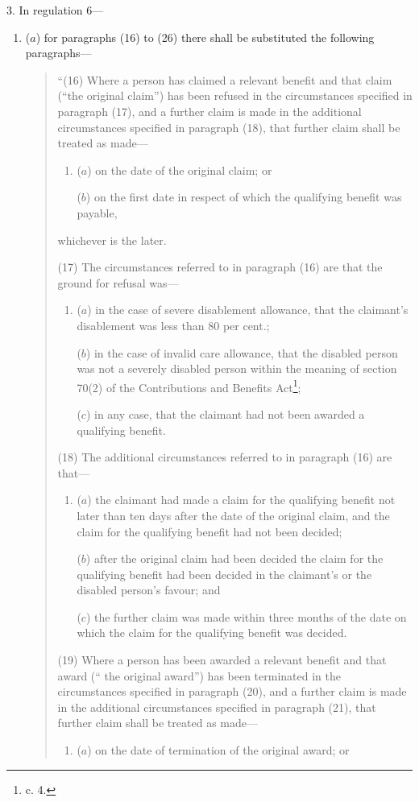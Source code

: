 \documentclass[12pt,a4paper]{article}
\begin{document}
3.  In regulation 6—
\begin{enumerate}\item[]
($a$) for paragraphs (16) to (26) there shall be substituted the following paragraphs—
\begin{quotation}
“(16) Where a person has claimed a relevant benefit and that claim (“the original claim”) has been refused in the circumstances specified in paragraph (17), and a further claim is made in the additional circumstances specified in paragraph (18), that further claim shall be treated as made—
\begin{enumerate}\item[]
($a$) on the date of the original claim; or

($b$) on the first date in respect of which the qualifying benefit was payable,
\end{enumerate}
whichever is the later.

(17) The circumstances referred to in paragraph (16) are that the ground for refusal was—
\begin{enumerate}\item[]
($a$) in the case of severe disablement allowance, that the claimant’s disablement was less than 80 per cent.;

($b$) in the case of invalid care allowance, that the disabled person was not a severely disabled person within the meaning of section 70(2) of the Contributions and Benefits Act\footnote{ c. 4.};

($c$) in any case, that the claimant had not been awarded a qualifying benefit.
\end{enumerate}

(18) The additional circumstances referred to in paragraph (16) are that—
\begin{enumerate}\item[]
($a$) the claimant had made a claim for the qualifying benefit not later than ten days after the date of the original claim, and the claim for the qualifying benefit had not been decided;

($b$) after the original claim had been decided the claim for the qualifying benefit had been decided in the claimant’s or the disabled person’s favour; and

($c$) the further claim was made within three months of the date on which the claim for the qualifying benefit was decided.
\end{enumerate}

(19) Where a person has been awarded a relevant benefit and that award (“ the original award”) has been terminated in the circumstances specified in paragraph (20), and a further claim is made in the additional circumstances specified in paragraph (21), that further claim shall be treated as made—
\begin{enumerate}\item[]
($a$) on the date of termination of the original award; or


\end{enumerate}
\end{quotation}
\end{enumerate}
\end{document}
